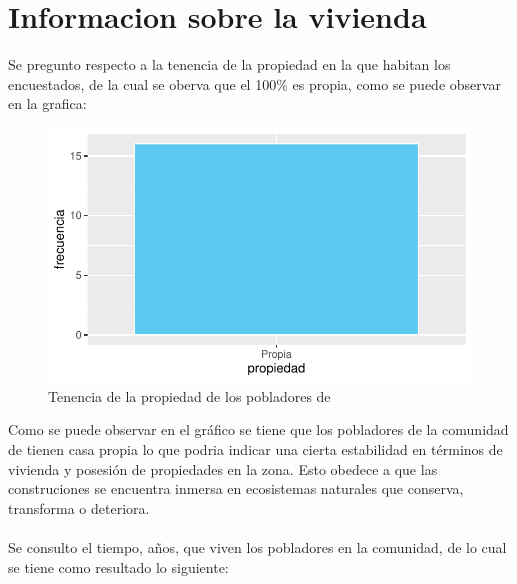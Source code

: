 \documentclass[12pt]{article}\usepackage[]{graphicx}\usepackage[]{xcolor}
\makeatletter
\def\maxwidth{ %
  \ifdim\Gin@nat@width>\linewidth
    \linewidth
  \else
    \Gin@nat@width
  \fi
}
\newenvironment{knitrout}{}{} %
\makeatother
\begin{document}
	\section{Informacion sobre la vivienda}
Se pregunto respecto a la tenencia de la propiedad en la que habitan los encuestados, de la cual se oberva que el 100\% es propia, como se puede observar en la grafica:
	\begin{figure}[H]
	\centering
\begin{knitrout}
\color{fgcolor}
\includegraphics[width=\maxwidth]{figure/tres-1} 
\end{knitrout}
	\caption{Tenencia de la propiedad de los pobladores de \comunidad}
	\end{figure}
	Como se puede observar en el gráfico se tiene que los pobladores de la comunidad de \comunidad tienen casa propia lo que podria indicar una cierta estabilidad en términos de vivienda y posesión de propiedades en la zona. Esto obedece a que las construciones se encuentra inmersa en ecosistemas naturales que conserva, transforma o deteriora.\\
	\\
	Se consulto el tiempo, años, que viven los pobladores en la comunidad, de lo cual se tiene como resultado lo siguiente:
\end{document}
